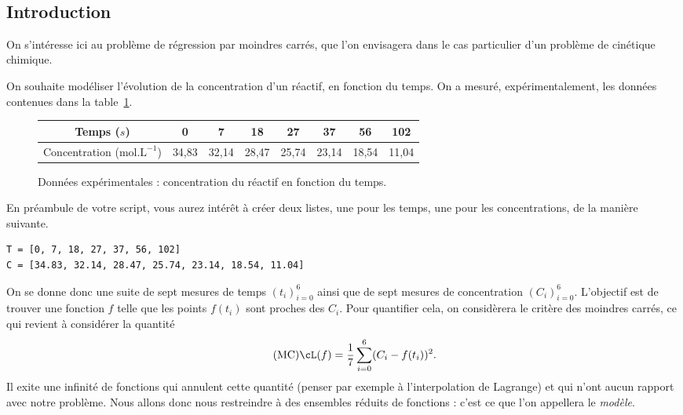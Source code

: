\exer{[SATIO-004]}
\setcounter{numques}{0}~\\
\subsection*{Introduction}

On s'intéresse ici au problème de régression par moindres carrés, que l'on envisagera dans le cas particulier d'un problème de cinétique chimique. 

On souhaite modéliser l'évolution de la concentration d'un réactif, en fonction du temps. On a 
mesuré, expérimentalement, les données contenues dans la table~\ref{table:donnees}.
\begin{figure}[!h]
  \begin{center}
    \setlength\extrarowheight{2.5pt}
    \begin{tabular}{|c|c|c|c|c|c|c|c|}
      \hline
      Temps ($s$) & 0 & 7 & 18 & 27 & 37 & 56 & 102 \\[2.5pt]
      \hline
      Concentration ($\textrm{mol}.\textrm{L}^{-1}$) & 34,83 & 32,14 & 28,47 & 25,74 & 23,14 & 18,54 & 11,04\\[2.5pt]
      \hline
    \end{tabular}
    \caption{Données expérimentales : concentration du réactif en fonction du temps.}
    \label{table:donnees}
  \end{center}
\end{figure}

\begin{rem}
  En préambule de votre script, vous aurez intérêt à créer deux listes, une pour les temps, une pour les concentrations, de la manière suivante. 
\begin{lstlisting}
T = [0, 7, 18, 27, 37, 56, 102]
C = [34.83, 32.14, 28.47, 25.74, 23.14, 18.54, 11.04]
\end{lstlisting}

\end{rem}


On se donne donc une suite de sept mesures de temps $(t_i)_{i=0}^6$ ainsi que de sept mesures de concentration $(C_i)_{i=0}^6$. 
L'objectif est de trouver une fonction $f$ telle que les points $f(t_i)$ sont proches des $C_i$. 
Pour quantifier cela, on considèrera le critère des moindres carrés, ce qui revient à considérer la quantité 
\begin{equation}\label{eq.mc}\tag{MC}
  \cL(f) = \dfrac{1}{7}\sum_{i=0}^6 (C_i - f(t_i))^2 .
\end{equation}
Il exite une infinité de fonctions qui annulent cette quantité (penser par exemple à l'interpolation de Lagrange) et qui n'ont aucun rapport avec notre problème. 
Nous allons donc nous restreindre à des ensembles réduits de fonctions : c'est ce que l'on appellera le \emph{modèle}.

